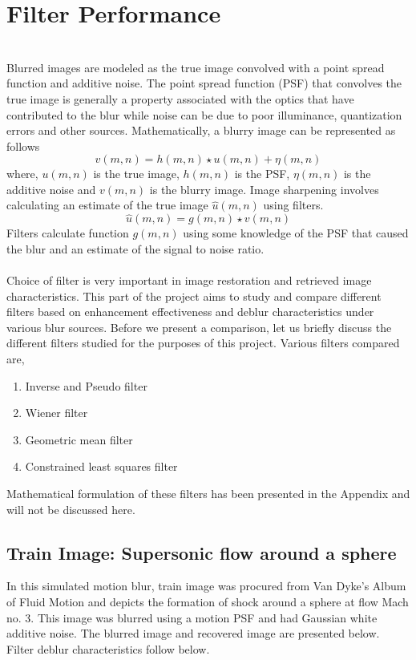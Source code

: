 \graphicspath{{mehul_pics/}}%

\chapter{Filter Performance}
\\
Blurred images are modeled as the true image convolved with a point spread function and additive noise. The point spread function (PSF) that convolves the true image is generally a property associated with the optics that have contributed to the blur while noise can be due to poor illuminance, quantization errors and other sources. Mathematically, a blurry image can be represented as follows\\
\begin{equation}
v(m,n)= h(m,n) \star u(m,n) + \eta(m,n)
\end{equation}
where, $u(m,n)$ is the true image, $h(m,n)$ is the PSF, $\eta(m,n)$ is the additive noise and $v(m,n)$ is the blurry image. Image sharpening involves calculating an estimate of the true image $\hat{u}(m,n)$ using filters.
\begin{equation}
\hat{u}(m,n)= g(m,n) \star v(m,n)
\end{equation}
Filters calculate function $g(m,n)$ using some knowledge of the PSF that caused the blur and an estimate of the signal to noise ratio.\\

\\
Choice of filter is very important in image restoration and retrieved image characteristics. This part of the project aims to study and compare different filters based on enhancement effectiveness and deblur characteristics under various blur sources. Before we present a comparison, let us briefly discuss the different filters studied for the purposes of this project. Various filters compared are, 
\begin{enumerate}
\item Inverse and Pseudo filter
\item Wiener filter
\item Geometric mean filter
\item Constrained least squares filter
\end{enumerate} 
Mathematical formulation of these filters has been presented in the Appendix and will not be discussed here. 
\section{Train Image: Supersonic flow around a sphere}
In this simulated motion blur, train image was procured from Van Dyke's Album of Fluid Motion and depicts the formation of shock around a sphere at flow Mach no. 3. This image was blurred using a motion PSF and had Gaussian white additive noise. The blurred image and recovered image are presented below. Filter deblur characteristics follow below.

